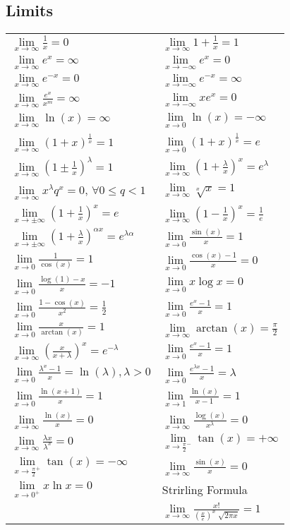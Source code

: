 \documentclass[a4paper, 10pt]{article}
\theoremstyle{definition}
\theoremstyle{named}
\begin{document}
\subsection*{Limits}
\newcommand{\limxi}{\lim\limits_{x\to\infty}}
\newcommand{\limxni}{\lim\limits_{x\to-\infty}}
\newcommand{\limx}{\lim\limits_{x\to\pm\infty}}
\newcommand{\limxz}{\lim\limits_{x\to0}}
\renewcommand{\arraystretch}{1.8}
\begin{tabularx}{\linewidth}{XX}
    $\limxi \frac{1}{x} = 0$ & $\limxi 1 + \frac{1}{x} = 1$ \\
    $\limxi e^x = \infty$ & $\limxni e^x = 0$ \\
    $\limxi e^{-x} = 0$ & $\limxni e^{-x} = \infty$ \\
    $\limxi \frac{e^x}{x^m} = \infty$ & $\limxni xe^x = 0$ \\
    $\limxi \ln(x) = \infty$ & $\limxz \ln(x) = -\infty$ \\
    $\limxi (1 + x)^\frac{1}{x} = 1$ & $\limxz (1 + x)^\frac{1}{x} = e$ \\
    $\limxi (1 \pm \frac{1}{x})^\lambda = 1$ & $\limxi (1 + \frac{\lambda}{x})^x = e^\lambda$ \\
    $\limxi x^\lambda q^x = 0$, $\forall 0 \leq q < 1$ & $\limxi \sqrt[x]{x} = 1$ \\
    $\limx (1 + \frac{1}{x})^x = e$ & $\limxi (1 - \frac{1}{x})^x = \frac{1}{e}$ \\
    $\limx (1 + \frac{\lambda}{x})^{\alpha x} = e^{\lambda \alpha}$ & $\limxz \frac{\sin(x)}{x} = 1$ \\
    $\limxz \frac{1}{\cos(x)} = 1$ & $\limxz \frac{\cos(x) - 1}{x} = 0$ \\
    $\limxz \frac{\log(1) - x}{x} = -1$ & $\limxz x \log x = 0$ \\
    $\limxz \frac{1 - \cos(x)}{x^2} = \frac{1}{2}$ & $\limxz \frac{e^x - 1}{x} = 1$ \\
    $\limxz \frac{x}{\arctan(x)} = 1$ & $\limxi \arctan(x) = \frac{\pi}{2}$ \\
    $\limxi (\frac{x}{x + \lambda})^x = e^{-\lambda}$ & $\limxz \frac{e^x - 1}{x} = 1$ \\
    $\limxz \frac{\lambda^x - 1}{x} = \ln(\lambda), \lambda > 0$ & $\limxz \frac{e^{\lambda x} - 1}{x} = \lambda$ \\
    $\limxz \frac{\ln(x+1)}{x} = 1$ & $\lim\limits_{x \to 1} \frac{\ln(x)}{x - 1} = 1$ \\
    $\limxi \frac{\ln(x)}{x} = 0$ & $\limxi \frac{\log(x)}{x^\lambda} = 0$ \\
    $\limxi \frac{\lambda x}{\lambda^x} = 0$ & $\lim\limits_{x \to \frac{\pi}{2}^-} \tan(x) = +\infty$\\
    $\lim\limits_{x \to \frac{\pi}{2}^+} \tan(x) = -\infty$ & $\limxi \frac{\sin(x)}{x} = 0$ \\
    $\lim\limits_{x \to 0^+} x \ln x = 0$ & Strirling Formula \\
    & $\limxi \frac{x!}{(\frac{x}{e})^x \sqrt[]{2 \pi x}} = 1$
\end{tabularx}
\end{document}
